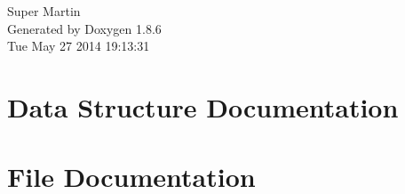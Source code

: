 \documentclass[twoside]{article}
\begin{document}
\hypersetup{pageanchor=false}
\begin{titlepage}
\vspace*{7cm}
\begin{center}%
{\Large Super Martin }\\
\vspace*{1cm}
{\large Generated by Doxygen 1.8.6}\\
\vspace*{0.5cm}
{\small Tue May 27 2014 19:13:31}\\
\end{center}
\end{titlepage}
\tableofcontents
{}
\hypersetup{pageanchor=true}

\section{Data Structure Documentation}












\section{File Documentation}







































\newpage
{}
{}
\printindex
\end{document}
